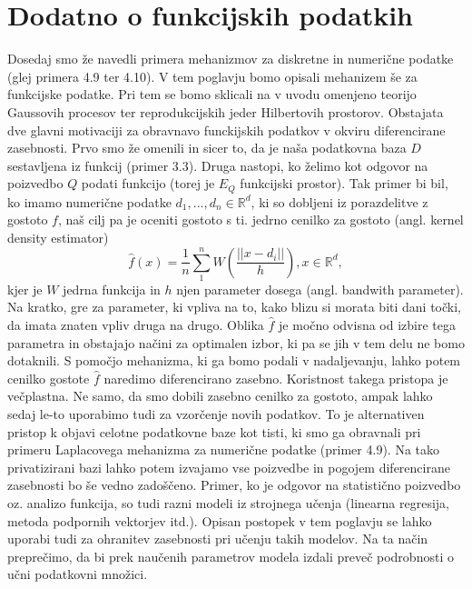 \documentclass[12pt,a4paper]{amsart}
\theoremstyle{definition} %
\theoremstyle{plain} %
\begin{document}
\section{Dodatno o funkcijskih podatkih}
Dosedaj smo že navedli primera mehanizmov za diskretne in numerične podatke (glej primera 4.9 ter 4.10). V tem poglavju bomo opisali mehanizem še  za funkcijske podatke. Pri tem se bomo sklicali na v uvodu omenjeno teorijo Gaussovih procesov ter reprodukcijskih jeder Hilbertovih prostorov.
\newline
\newline
Obstajata dve glavni motivaciji za obravnavo funckijskih podatkov v okviru diferencirane zasebnosti. Prvo smo že omenili in sicer to, da je naša podatkovna baza $D$ sestavljena iz funkcij (primer 3.3). Druga nastopi, ko želimo kot odgovor na poizvedbo $Q$ podati funkcijo (torej je $E_Q$ funkcijski prostor). Tak primer bi bil, ko imamo numerične podatke $d_1, ..., d_n \in \mathbb{R}^d$, ki so dobljeni iz porazdelitve z gostoto $f$, naš cilj pa je oceniti gostoto s ti. jedrno cenilko za gostoto (angl. kernel density estimator) $$\hat{f}(x)=\frac{1}{n}\sum_{1}^{n}W(\frac{||x-d_i||}{h}), x \in \mathbb{R}^d,$$  
kjer je $W$ jedrna funkcija in $h$ njen parameter dosega (angl. bandwith parameter). Na kratko, gre za parameter, ki vpliva na to, kako blizu si morata biti dani točki, da imata znaten vpliv druga na drugo. Oblika $\hat{f}$ je močno odvisna od izbire tega parametra in obstajajo načini za optimalen izbor, ki pa se jih v tem delu ne bomo dotaknili. S pomočjo mehanizma, ki ga bomo podali v nadaljevanju, lahko potem cenilko gostote $\hat{f}$ naredimo diferencirano zasebno. Koristnost takega pristopa je večplastna. Ne samo, da smo dobili zasebno cenilko za gostoto, ampak lahko sedaj le-to uporabimo tudi za vzorčenje novih podatkov. To je alternativen pristop k objavi celotne podatkovne baze kot tisti, ki smo ga obravnali pri primeru Laplacovega mehanizma za numerične podatke (primer 4.9). Na tako privatizirani bazi lahko potem izvajamo vse poizvedbe in pogojem diferencirane zasebnosti bo še vedno zadoščeno. Primer, ko je odgovor na statistično poizvedbo oz. analizo funkcija, so tudi razni modeli iz strojnega učenja (linearna regresija, metoda podpornih vektorjev itd.). Opisan postopek v tem poglavju se lahko uporabi tudi za ohranitev zasebnosti pri učenju takih modelov. Na ta način preprečimo, da bi prek naučenih parametrov modela izdali preveč podrobnosti o učni podatkovni množici.
\newline
\newline
\end{document}
